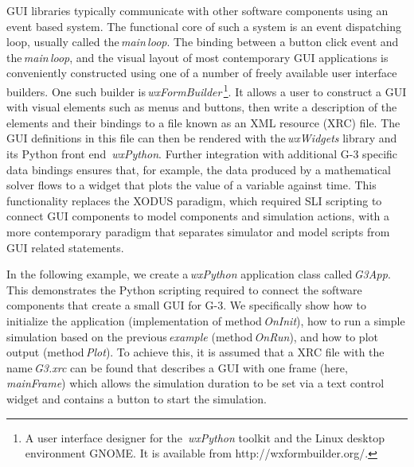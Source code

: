 \documentclass[10pt]{article}
\begin{document}
GUI libraries typically communicate with other software components
using an event based system.  The functional core of such a system is an
event dispatching loop, usually called the\,{\it main\,loop}.
The binding between a button click event and the\,{\it main\,loop}, and
the visual layout of most contemporary GUI applications is
conveniently constructed using one of a number of freely available user
interface builders.
%
%
One such builder is\,{\it wxFormBuilder}\,\footnote{A user interface designer for the\,{\it
    wxPython} toolkit and the Linux desktop environment GNOME. It is
  available from http://wxformbuilder.org/.}. It allows a user to construct a GUI with visual elements
such as menus and buttons, then write a description of the elements and
their bindings to a file known as an XML resource (XRC) file.  The GUI
definitions in this file can then be rendered with the\,{\it wxWidgets} library and its Python front end\,{\it
  wxPython}.  Further integration with additional G-3 specific data
bindings ensures that, for example, the data produced by a
mathematical solver flows to a widget that plots the value of a
variable against time.  This functionality replaces the
XODUS paradigm, which required SLI scripting to connect GUI components
to model components and simulation actions, with a more contemporary
paradigm that separates simulator and model scripts from GUI related
statements.

In the following example, we create a\,{\it wxPython} application class
called\,{\it G3App}. This demonstrates the Python scripting required to
connect the software components that create a small GUI for G-3.  We
specifically show how to initialize the application (implementation of
method\,{\it OnInit}), how to run a simple simulation based on the
previous\,{\it example} (method\,{\it OnRun}), and how to plot output
(method\,{\it Plot}).  To achieve this, it is assumed that a XRC file with the
name\,{\it G3.xrc} can be found that describes a GUI with one frame
(here,\,{\it mainFrame}) which allows the simulation duration to be set
via a text control widget and contains a button to start the simulation.
\end{document}
